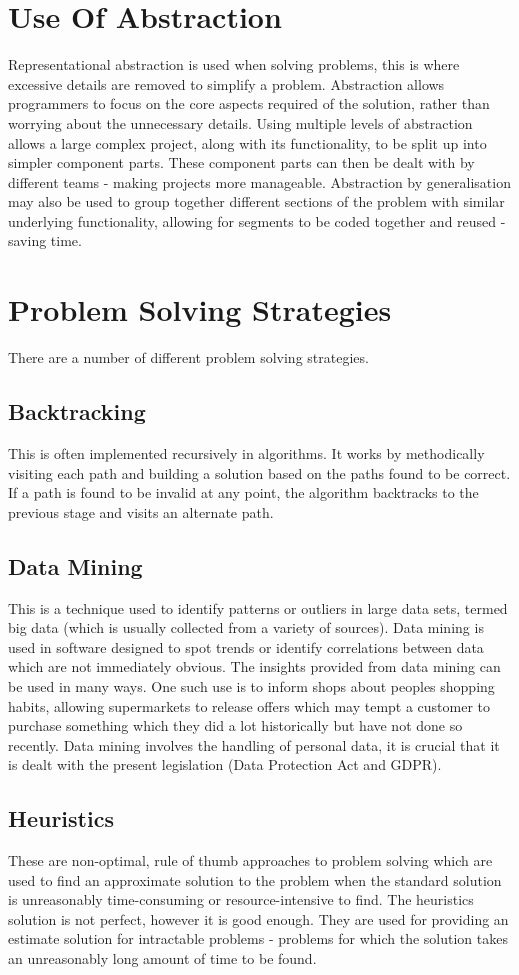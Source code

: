 \documentclass[a4paper,11pt, twocolumn]{article}
\begin{document}
\section{Use Of Abstraction}
Representational abstraction is used when solving problems, this is where excessive details are removed to simplify a problem. Abstraction allows programmers to focus on the core aspects required of the solution, rather than worrying about the unnecessary details. Using multiple levels of abstraction allows a large complex project, along with its functionality, to be split up into simpler component parts. These component parts can then be dealt with by different teams - making projects more manageable. Abstraction by generalisation may also be used to group together different sections of the problem with similar underlying functionality, allowing for segments to be coded together and reused - saving time.

\section{Problem Solving Strategies}
There are a number of different problem solving strategies.
\subsection{Backtracking}
This is often implemented recursively in algorithms. It works by methodically visiting each path and building a solution based on the paths found to be correct. If a path is found to be invalid at any point, the algorithm backtracks to the previous stage and visits an alternate path.
\subsection{Data Mining}
This is a technique used to identify patterns or outliers in large data sets, termed big data (which is usually collected from a variety of sources). Data mining is used in software designed to spot trends or identify correlations between data which are not immediately obvious. The insights provided from data mining can be used in many ways. One such use is to inform shops about peoples shopping habits, allowing supermarkets to release offers which may tempt a customer to purchase something which they did a lot historically but have not done so recently. Data mining involves the handling of personal data, it is crucial that it is dealt with the present legislation (Data Protection Act and GDPR).
\subsection{Heuristics}
These are non-optimal, rule of thumb approaches to problem solving which are used to find an approximate solution to the problem when the standard solution is unreasonably time-consuming or resource-intensive to find. The heuristics solution is not perfect, however it is good enough. They are used for providing an estimate solution for intractable problems - problems for which the solution takes an unreasonably long amount of time to be found.
\end{document}

